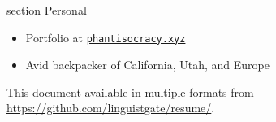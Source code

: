 \documentclass[10pt]{article}
\newcommand{\sectionhead}[1]{%
\begin{bgbox}{section}%
{\Large \textsf{#1}}%
\end{bgbox}%
}
\begin{document}
\sectionhead{Personal}
\label{Extracurricular}
\begin{itemize}
\item Portfolio at \href{https://phantisocracy.xyz}{\texttt{phantisocracy.xyz}}
\item Avid backpacker of California, Utah, and Europe
\end{itemize}

\vfill
This document available in multiple formats from
\url{https://github.com/linguistgate/resume/}.
\end{document}
